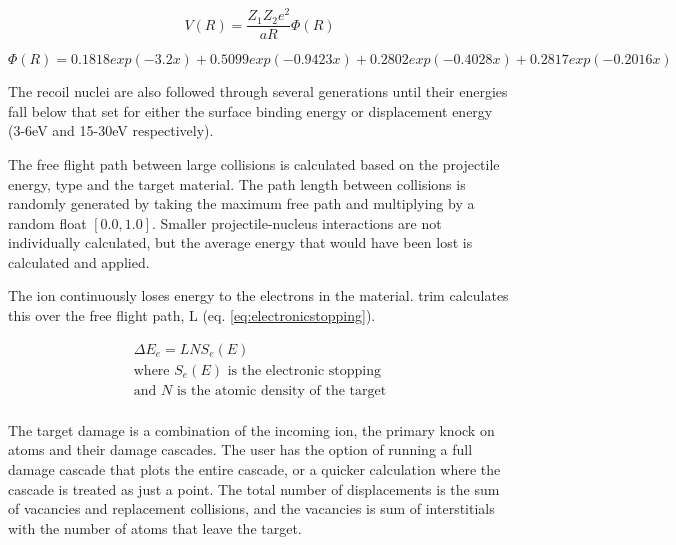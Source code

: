 \begin{equation}
V(R) = \frac{Z_1 Z_2 e^2}{a R} \Phi(R)
\label{eq:interatomicpotential}
\end{equation}

\begin{equation}
\Phi(R) = 0.1818 exp(-3.2 x) + 0.5099 exp(-0.9423 x) + 0.2802 exp(-0.4028 x) + 0.2817 exp(-0.2016 x)
\label{eq:universalscreening}
\end{equation}

The recoil nuclei are also followed through several generations until their energies fall below that set for either the surface binding energy or displacement energy (3-6eV and 15-30eV respectively)\cite{srimbook}.  

The free flight path between large collisions is calculated based on the projectile energy, type and the target material.  The path length between collisions is randomly generated by taking the maximum free path and multiplying by a random float $[0.0, 1.0]$.  Smaller projectile-nucleus interactions are not individually calculated, but the average energy that would have been lost is calculated and applied.

The ion continuously loses energy to the electrons in the material.  \acrshort{trim} calculates this over the free flight path, L (eq. \ref{eq:electronicstopping}).

\begin{equation}
\begin{split}
\Delta E_e = L N S_e (E) \\
\text{where } S_e (E) \text{ is the electronic stopping} \\
\text{and } N \text{ is the atomic density of the target} \\
\end{split}
\label{eq:electronicstopping}
\end{equation}

The target damage is a combination of the incoming ion, the primary knock on atoms and their damage cascades.  The user has the option of running a full damage cascade that plots the entire cascade, or a quicker calculation where the cascade is treated as just a point.  The total number of displacements is the sum of vacancies and replacement collisions, and the vacancies is sum of interstitials with the number of atoms that leave the target.

